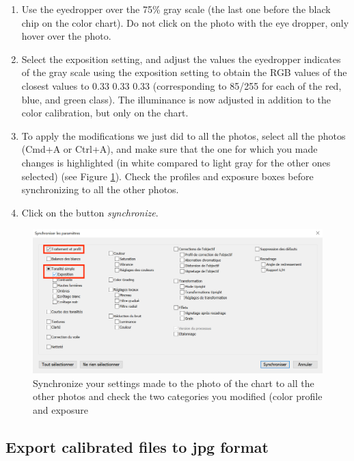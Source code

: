 \documentclass[
]{book}
\begin{document}
\begin{enumerate}
\def\labelenumi{\arabic{enumi}.}
\setcounter{enumi}{4}
\item
  Use the eyedropper over the 75\% gray scale (the last one before the
  black chip on the color chart). Do not click on the photo with
  the eye dropper, only hover over the photo.
\item
  Select the exposition setting, and adjust the values the eyedropper
  indicates of the gray scale using the exposition setting to obtain
  the RGB values of the closest values to 0.33 0.33 0.33
  (corresponding to 85/255 for each of the red, blue, and green
  class). The illuminance is now adjusted in addition to the color
  calibration, but only on the chart.
\item
  To apply the modifications we just did to all the photos, select all the photos (Cmd+A or Ctrl+A), and make sure that the one for which you made changes is highlighted (in white compared to light gray for the other ones selected) (see Figure \ref{fig:synchronize}). Check the profiles and exposure boxes before synchronizing to all the other photos.
\item
  Click on the button \emph{synchronize}.
\end{enumerate}

\begin{figure}

{\centering \includegraphics[width=0.8\linewidth]{Figures/synchronize_capture} 

}

\caption{Synchronize your settings made to the photo of the chart to all the other photos and check the two categories you modified (color profile and exposure}\label{fig:synchronize}
\end{figure}

\hypertarget{export-calibrated-files-to-jpg-format}{%
\subsection{Export calibrated files to jpg format}\label{export-calibrated-files-to-jpg-format}}
\end{document}
